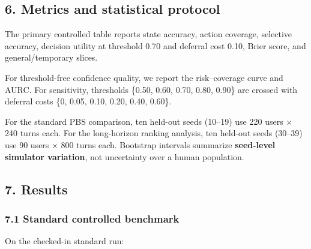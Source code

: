 \documentclass[
  10pt,
  letterpaper,
]{article}
\begin{document}
\subsection{6. Metrics and statistical
protocol}\label{metrics-and-statistical-protocol}

The primary controlled table reports state accuracy, action coverage,
selective accuracy, decision utility at threshold 0.70 and deferral cost
0.10, Brier score, and general/temporary slices.

For threshold-free confidence quality, we report the risk--coverage
curve and AURC. For sensitivity, thresholds \{0.50, 0.60, 0.70, 0.80,
0.90\} are crossed with deferral costs \{0, 0.05, 0.10, 0.20, 0.40,
0.60\}.

For the standard PBS comparison, ten held-out seeds (10--19) use 220
users × 240 turns each. For the long-horizon ranking analysis, ten
held-out seeds (30--39) use 90 users × 800 turns each. Bootstrap
intervals summarize \textbf{seed-level simulator variation}, not
uncertainty over a human population.

\subsection{7. Results}\label{results}

\subsubsection{7.1 Standard controlled
benchmark}\label{standard-controlled-benchmark}

On the checked-in standard run:
\end{document}
